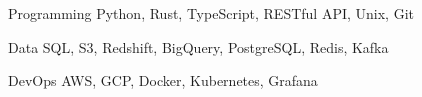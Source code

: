 

\begin{cvskills}

  \cvskill
    {Programming} %
    {Python, Rust, TypeScript, RESTful API, Unix, Git} %
    
  \cvskill
    {Data} %
    {SQL, S3, Redshift, BigQuery, PostgreSQL, Redis, Kafka} %
        
  \cvskill
    {DevOps} %
    {AWS, GCP, Docker, Kubernetes, Grafana} %

\end{cvskills}
